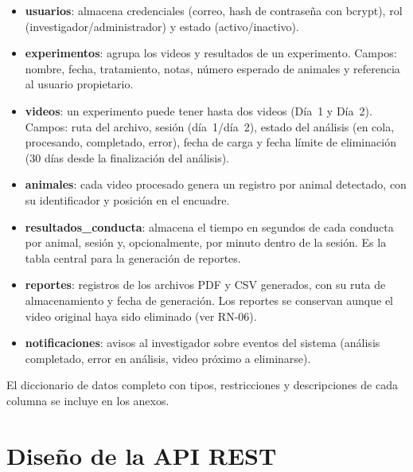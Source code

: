 \begin{itemize}
  \item \textbf{usuarios}: almacena credenciales (correo, hash de contraseña con
        bcrypt), rol (investigador/administrador) y estado (activo/inactivo).

  \item \textbf{experimentos}: agrupa los videos y resultados de un experimento.
        Campos: nombre, fecha, tratamiento, notas, número esperado de animales y
        referencia al usuario propietario.

  \item \textbf{videos}: un experimento puede tener hasta dos videos (Día~1 y
        Día~2). Campos: ruta del archivo, sesión (día~1/día~2), estado del análisis
        (en cola, procesando, completado, error), fecha de carga y fecha límite de
        eliminación (30 días desde la finalización del análisis).

  \item \textbf{animales}: cada video procesado genera un registro por animal
        detectado, con su identificador y posición en el encuadre.

  \item \textbf{resultados\_conducta}: almacena el tiempo en segundos de cada
        conducta por animal, sesión y, opcionalmente, por minuto dentro de la
        sesión. Es la tabla central para la generación de reportes.

  \item \textbf{reportes}: registros de los archivos PDF y CSV generados, con su
        ruta de almacenamiento y fecha de generación. Los reportes se conservan
        aunque el video original haya sido eliminado (ver RN-06).

  \item \textbf{notificaciones}: avisos al investigador sobre eventos del sistema
        (análisis completado, error en análisis, video próximo a eliminarse).
\end{itemize}

El diccionario de datos completo con tipos, restricciones y descripciones de cada
columna se incluye en los anexos.

\section{Diseño de la API REST}

